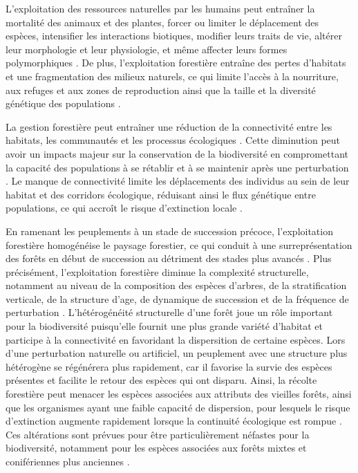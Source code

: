 L'exploitation des ressources naturelles par les humains peut entraîner la mortalité des animaux et des plantes, forcer ou limiter le déplacement des espèces, intensifier les interactions biotiques, modifier leurs traits de vie, altérer leur morphologie et leur physiologie, et même affecter leurs formes polymorphiques \citep{Sergio2018Animalresponses}. 
De plus, l'exploitation forestière entraîne des pertes d'habitats et une fragmentation des milieux naturels, ce qui limite l'accès à la nourriture, aux refuges et aux zones de reproduction ainsi que la taille et la diversité génétique des populations \citep{Coelho2020Effectsanthropogenic}.

La gestion forestière peut entraîner une réduction de la connectivité entre les habitats, les communautés et les processus écologiques \citep{Lindenmayer2006Generalmanagement}.
Cette diminution peut avoir un impacts majeur sur la conservation de la biodiversité en compromettant la capacité des populations à se rétablir et à se maintenir après une perturbation \citep{Lamberson1994ReserveDesign}. 
Le manque de connectivité limite les déplacements des individus au sein de leur habitat et des corridors écologique, réduisant ainsi le flux génétique entre populations, ce qui accroît le risque d'extinction locale \citep{Saccheri1998Inbreedingextinction}.

En ramenant les peuplements à un stade de succession précoce, l'exploitation forestière homogénéise le paysage forestier, ce qui conduit à une surreprésentation des forêts en début de succession au détriment des stades plus avancés \citep{Cyr2009Forestmanagement,Boucher2017Cumulativepatterns}. 
Plus précisément, l'exploitation forestière diminue la complexité structurelle, notamment au niveau de la composition des espèces d'arbres, de la stratification verticale, de la structure d'age, de dynamique de succession et de la fréquence de perturbation \citep{Commarmot2005Structurevirgin}. 
L'hétérogénéité structurelle d'une forêt joue un rôle important pour la biodiversité puisqu'elle fournit une plus grande variété d'habitat et participe à la connectivité en favoridant la dispersition de certaine espèces. 
Lors d'une perturbation naturelle ou artificiel, un peuplement avec une structure plus hétérogène se régénérera plus rapidement, car il favorise la survie des espèces présentes et facilite le retour des espèces qui ont disparu. 
Ainsi, la récolte forestière peut menacer les espèces associées aux attributs des vieilles forêts, ainsi que les organismes ayant une faible capacité de dispersion, pour lesquels le risque d'extinction augmente rapidement lorsque la continuité écologique est rompue \citep{Norden2001Conceptualproblems,Martin2021indicatorspecies}.  
Ces altérations sont prévues pour être particulièrement néfastes pour la biodiversité, notamment pour les espèces associées aux forêts mixtes et conifériennes plus anciennes \citep{Tremblay2018Harvestinginteracts,Cadieux2020Projectedeffects}.

